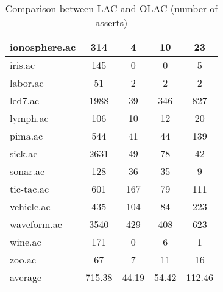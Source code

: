\begin{table}[htbp]
\begin{tabular}{|l|c|c|c|c|}
		\hline
		ionosphere.ac   & 314           & 4                  & 10                       & 23                            \\
		\hline
		iris.ac         & 145           & 0                  & 0                        & 5                             \\
		\hline
		labor.ac        & 51            & 2                  & 2                        & 2                             \\
		\hline
		led7.ac         & 1988          & 39                 & 346                      & 827                           \\
		\hline
		lymph.ac        & 106           & 10                 & 12                       & 20                            \\
		\hline
		pima.ac         & 544           & 41                 & 44                       & 139                           \\
		\hline
		sick.ac         & 2631          & 49                 & 78                       & 42                            \\
		\hline
		sonar.ac        & 128           & 36                 & 35                       & 9                             \\
		\hline
		tic-tac.ac      & 601           & 167                & 79                       & 111                           \\
		\hline
		vehicle.ac      & 435           & 104                & 84                       & 223                           \\
		\hline
		waveform.ac     & 3540          & 429                & 408                      & 623                           \\
		\hline
		wine.ac         & 171           & 0                  & 6                        & 1                             \\
		\hline
		zoo.ac          & 67            & 7                  & 11                       & 16                            \\
		\hline
		average         & 715.38        & 44.19              & 54.42                    & 112.46                        \\
		\hline
		\end{tabular}
	\caption{Comparison between LAC and OLAC (number of asserts)}
	\label{tab:comparison_lac_olac}
\end{table}